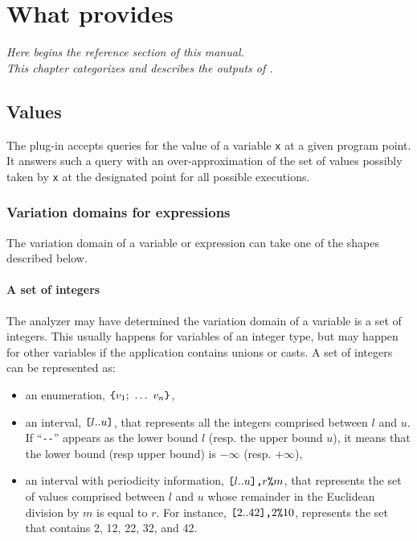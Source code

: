 \documentclass{frama-c-book}
\newcommand{\bropen}{\mbox{\tt [}}
\newcommand{\brclose}{\mbox{\tt ]}}
\newcommand{\cbopen}{\mbox{\tt \{}}
\newcommand{\cbclose}{\mbox{\tt \}}}
\begin{document}
\chapter{What \Eva{} provides}\label{what}
\vspace{2cm}

{\em Here begins the reference section of this manual.\\
This chapter categorizes and describes the outputs of \Eva{}.}

\vspace{2cm}

\section{Values}
\label{sec:values}

The \Eva{} plug-in accepts queries for the value of
a variable \lstinline|x| at a given program point. It answers such a
query with an over-approximation of the set of values possibly taken
by \lstinline|x| at the designated point for all possible executions.


\subsection{Variation domains for expressions}\label{valeurs}


The variation domain of a variable or expression can take one of
the shapes described below.

\subsubsection{A set of integers}
The analyzer may have determined the variation domain of a variable is
a set of integers.  This usually happens for variables of an integer
type, but may happen for other variables if the application contains
unions or casts. A set of integers can be represented as:

\begin{itemize}
\item an enumeration, $\cbopen v_1;\ \ldots\ v_n\cbclose$,
\item an interval, $\bropen l{\tt ..}u\brclose$, that represents all
  the integers comprised between $l$ and $u$. If ``\lstinline|--|'' appears
  as the lower bound $l$ (resp. the upper bound $u$), it means that the
  lower bound (resp upper bound) is $-\infty$ (resp. $+\infty$),
\item an interval with periodicity information,
  $\bropen l..u\brclose\mbox{\tt\/,}r\mbox{\tt \%}m$,
  that represents the set of values comprised between $l$ and $u$
  whose remainder in the Euclidean division by $m$ is equal to $r$.
  For instance, $\bropen 2..42\brclose\mbox{\tt\/,}2\mbox{\tt \%}10$,
  represents the set that contains 2, 12, 22, 32, and 42.
\end{itemize}
\end{document}
